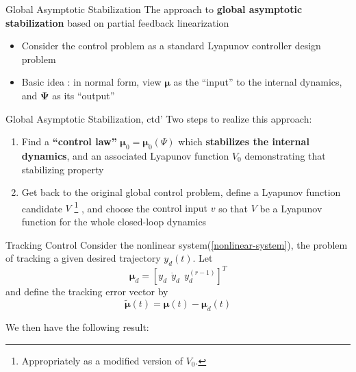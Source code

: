\documentclass{beamer}
\renewcommand{\vec}[1]{\ensuremath{\boldsymbol{#1}}} %
\begin{document}
\begin{frame}{Global Asymptotic Stabilization}
    The approach to \textbf{global asymptotic stabilization} based on partial feedback linearization
    \begin{itemize}
      \item Consider the control problem as a {\color{red}standard Lyapunov controller design problem}
      \item Basic idea : in normal form, view {\color{red}\vec{\mu} as the ``input'' to the internal dynamics, and \vec{\Psi} as its ``output''}
    \end{itemize}
\end{frame}

\begin{frame}{Global Asymptotic Stabilization, ctd'}
    Two steps to realize this approach:
    \begin{enumerate}
      \item Find a \textbf{``control law''} $\vec{\mu}_{0}=\vec{\mu}_{0}(\Psi)$ which \textbf{stabilizes the internal dynamics}, and an associated Lyapunov function $V_{0}$ demonstrating that stabilizing property
      \item Get back to the original global control problem, define a Lyapunov function candidate {\color{red}$V$} \footnote{Appropriately as a modified version of $V_{0}$.} , and choose the {\color{red}control input $v$} so that $V$ be a Lyapunov function for the whole closed-loop dynamics
    \end{enumerate}
\end{frame}


\begin{frame}{Tracking Control}
    Consider the nonlinear system(\ref{nonlinear-system}), the problem of tracking a given desired trajectory $y_{d}(t)$. Let
    $$ \vec{\mu}_{d} = \left[ y_{d}~~\dot{y}_{d}~~y_{d}^{(r-1)} \right]^{T} $$
    and define the tracking error vector by
    $$ \widetilde{\vec{\mu}}(t)=\vec{\mu}(t) - \vec{\mu}_{d}(t) $$

    We then have the following result:
\end{frame}
\end{document}
